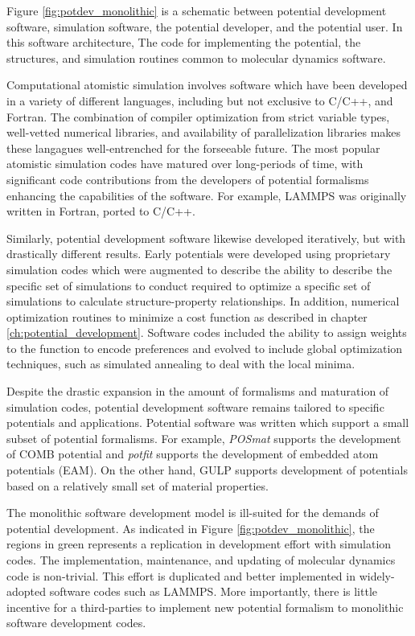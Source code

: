 Figure \ref{fig:potdev_monolithic} is a schematic between potential development software, simulation software, the potential developer, and the potential user.  In this software architecture, The code for implementing the potential, the structures, and simulation routines common to molecular dynamics software.  

Computational atomistic simulation involves software which have been developed in a variety of different languages, including but not exclusive to C/C++, and Fortran.  The combination of compiler optimization from strict variable types, well-vetted numerical libraries, and availability of parallelization libraries makes these langagues well-entrenched for the forseeable future.  The most popular atomistic simulation codes have matured over long-periods of time, with significant code contributions from the developers of potential formalisms enhancing the capabilities of the software.  For example, LAMMPS was originally written in Fortran, ported to C/C++.  

Similarly, potential development software likewise developed iteratively, but with drastically different results.  Early potentials were developed using proprietary simulation codes which were augmented to describe the ability to describe the specific set of simulations to conduct required to optimize a specific set of simulations to calculate structure-property relationships.   In addition, numerical optimization routines to minimize a cost function as described in chapter \ref{ch:potential_development}.  Software codes included the ability to assign weights to the function to encode preferences and evolved to include global optimization techniques, such as simulated annealing\cite{kirkpatrick1983_simmulated_annealing} to deal with the local minima.

Despite the drastic expansion in the amount of formalisms and maturation of simulation codes, potential development software remains tailored to specific potentials and applications.  Potential software was written which support a small subset of potential formalisms.  For example, \emph{POSmat}\cite{martinez2016_posmat} supports the development of COMB potential and \emph{potfit}\cite{brommer2015_potfit} supports the development of embedded atom potentials (EAM).  On the other hand, GULP supports development of potentials based on a relatively small set of material properties.   

The monolithic software development model is ill-suited for the demands of potential development.  As indicated in Figure \ref{fig:potdev_monolithic}, the regions in green represents a replication in development effort with simulation codes.  The implementation, maintenance, and updating of molecular dynamics code is non-trivial.  This effort is duplicated and better implemented in widely-adopted software codes such as LAMMPS.  More importantly,  there is little incentive for a third-parties to implement new potential formalism to monolithic software development codes.

